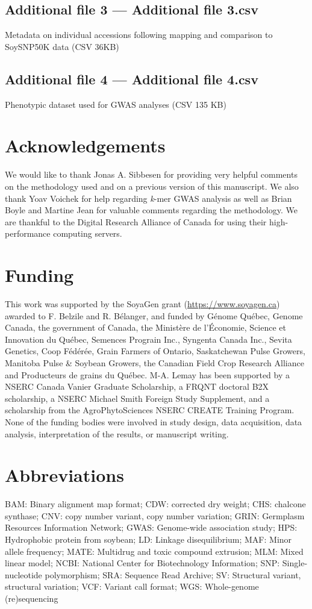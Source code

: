 \documentclass{article}
\begin{document}
\subsection*{Additional file 3 --- Additional file 3.csv}
Metadata on individual accessions following mapping
and comparison to SoySNP50K data (CSV 36KB)

\subsection*{Additional file 4 --- Additional file 4.csv}
Phenotypic dataset used for GWAS analyses (CSV 135 KB)

\section*{Acknowledgements}%

We would like to thank Jonas A. Sibbesen for providing very helpful comments
on the methodology used and on a previous version of this manuscript.
We also thank Yoav Voichek for help regarding \textit{k}-mer GWAS
analysis as well as Brian Boyle and Martine Jean for valuable comments
regarding the methodology. We are thankful to the Digital Research Alliance of
Canada for using their high-performance computing servers.

\section*{Funding}%

This work was supported by the SoyaGen grant (\url{https://www.soyagen.ca})
awarded to F. Belzile and R. Bélanger, and funded by Génome Québec, Genome
Canada, the government of Canada, the Ministère de l'Économie, Science et
Innovation du Québec, Semences Prograin Inc., Syngenta Canada Inc., Sevita
Genetics, Coop Fédérée, Grain Farmers of Ontario, Saskatchewan Pulse Growers,
Manitoba Pulse \& Soybean Growers, the Canadian Field Crop Research Alliance
and Producteurs de grains du Québec. M-A. Lemay has been supported by a NSERC
Canada Vanier Graduate Scholarship, a FRQNT doctoral B2X scholarship, a NSERC
Michael Smith Foreign Study Supplement, and a scholarship from the
AgroPhytoSciences NSERC CREATE Training Program. None of the funding bodies
were involved in study design, data acquisition, data analysis, interpretation
of the results, or manuscript writing.

\section*{Abbreviations}%
BAM: Binary alignment map format;
CDW: corrected dry weight;
CHS: chalcone synthase;
CNV: copy number variant, copy number variation;
GRIN: Germplasm Resources Information Network;
GWAS: Genome-wide association study;
HPS: Hydrophobic protein from soybean;
LD: Linkage disequilibrium;
MAF: Minor allele frequency;
MATE: Multidrug and toxic compound extrusion;
MLM: Mixed linear model;
NCBI: National Center for Biotechnology Information;
SNP: Single-nucleotide polymorphism;
SRA: Sequence Read Archive;
SV: Structural variant, structural variation;
VCF: Variant call format;
WGS: Whole-genome (re)sequencing
\end{document}
